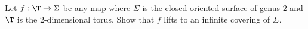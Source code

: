 Let $f:\T\rightarrow \Sigma$ be any map where $\Sigma$ is the closed
oriented surface of genus $2$ and $\T$ is the $2$-dimensional
torus. Show that $f$ lifts to an infinite covering of $\Sigma$. 
